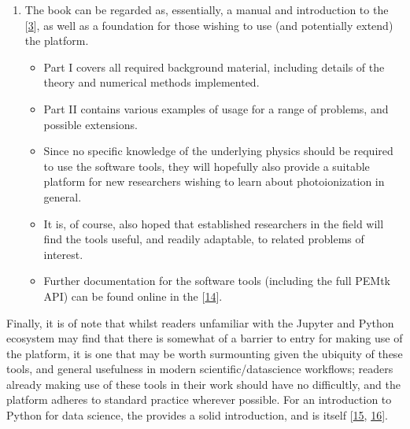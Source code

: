 \documentclass[letterpaper,table,10pt,english]{jupyterBook}
\begin{document}
\begin{enumerate}
\begin{itemize}
\end{itemize}

\item {} 
\sphinxAtStartPar
The book can be regarded as, essentially, a manual and introduction to the  {[}\hyperlink{cite.backmatter/bibliography:id668}{3}{]}, as well as a foundation for those wishing to use (and potentially extend) the platform.
\begin{itemize}
\item {} 
\sphinxAtStartPar
Part I covers all required background material, including details of the theory and numerical methods implemented.

\item {} 
\sphinxAtStartPar
Part II contains various examples of usage for a range of problems, and possible extensions.

\item {} 
\sphinxAtStartPar
Since no specific knowledge of the underlying physics should be required to use the software tools, they will hopefully also provide a suitable platform for new researchers wishing to learn about photoionization in general.

\item {} 
\sphinxAtStartPar
It is, of course, also hoped that established researchers in the field will find the tools useful, and readily adaptable, to related problems of interest.

\item {} 
\sphinxAtStartPar
Further documentation for the software tools (including the full PEMtk API) can be found online in the  {[}\hyperlink{cite.backmatter/bibliography:id667}{14}{]}.

\end{itemize}

\end{enumerate}

\sphinxAtStartPar
Finally, it is of note that whilst readers unfamiliar with the Jupyter and Python ecosystem may find that there is somewhat of a barrier to entry for making use of the platform, it is one that may be worth surmounting given the ubiquity of these tools, and general usefulness in modern scientific/data\sphinxhyphen{}science workflows; readers already making use of these tools in their work should have no difficultly, and the platform adheres to standard practice wherever possible. For an introduction to Python for data science, the  provides a solid introduction, and is itself  {[}\hyperlink{cite.backmatter/bibliography:id921}{15}, \hyperlink{cite.backmatter/bibliography:id922}{16}{]}.
\end{document}
